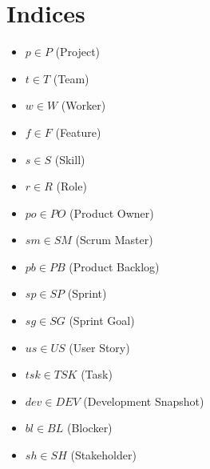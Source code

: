 \documentclass{article}
\begin{document}
\section{Indices}
\begin{itemize}
    \item $p \in P$ (Project)
    \item $t \in T$ (Team)
    \item $w \in W$ (Worker)
    \item $f \in F$ (Feature)
    \item $s \in S$ (Skill)
    \item $r \in R$ (Role)
    \item $po \in PO$ (Product Owner)
    \item $sm \in SM$ (Scrum Master)
    \item $pb \in PB$ (Product Backlog)
    \item $sp \in SP$ (Sprint)
    \item $sg \in SG$ (Sprint Goal)
    \item $us \in US$ (User Story)
    \item $tsk \in TSK$ (Task)
    \item $dev \in DEV$ (Development Snapshot)
    \item $bl \in BL$ (Blocker)
    \item $sh \in SH$ (Stakeholder)
\end{itemize}
\end{document}
